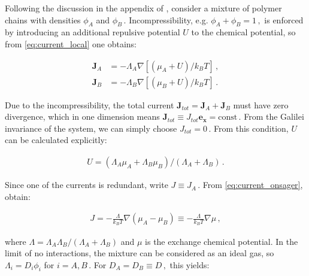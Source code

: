 \documentclass[bachelor,       %
               oneside,        %
               BCOR10mm,       %
               ngerman, english %
               ]{GAUBM}
\begin{document}






Following the discussion in the appendix of \cite{deGennes80}, consider a mixture of polymer chains with densities $\phi_A$ and $\phi_B\,.$ Incompressibility, e.g. $\phi_A+\phi_B=1\,,$ is enforced by introducing an additional repulsive potential $U$ to the chemical potential, so from \autoref{eq:current_local} one obtains:



\begin{subequations}
  \begin{align}
    \mathbf{J}_A&=-\Lambda_A\nabla [(\mu_A + U)/k_BT]\,,\\
    \mathbf{J}_B&=-\Lambda_B\nabla [(\mu_B + U)/k_BT]\,.
  \end{align}
  \label{eq:current_onsager}
\end{subequations}

Due to the incompressibility, the total current $\mathbf J_{tot}=\mathbf{J}_A+\mathbf{J}_B$ must have zero divergence, which in one dimension means $\mathbf J_{tot}\equiv J_{tot}\mathbf{e_x}=\mathrm{const}\,.$ From the Galilei invariance of the system, we can simply choose $J_{tot}=0\,.$ From this condition, $U$ can be calculated explicitly:

\begin{align}
  U=(\Lambda_A\mu_A+\Lambda_B\mu_B)/(\Lambda_A+\Lambda_B)\,.
\end{align}

Since one of the currents is redundant, write $J\equiv J_A\,.$ From \autoref{eq:current_onsager}, obtain:

\begin{align}
  J=-\frac{\Lambda}{k_BT}\nabla(\mu_A - \mu_B)\equiv -\frac{\Lambda}{k_BT}\nabla\mu\,,
\end{align}

where $\Lambda=\Lambda_A\Lambda_B/(\Lambda_A+\Lambda_B)$ and $\mu$ is the exchange chemical potential. In the limit of no interactions, the mixture can be considered as an ideal gas, so $\Lambda_i=D_i\phi_i$ for $i=A, B\,.$ For $D_A=D_B\equiv D\,,$ this yields:
\end{document}
